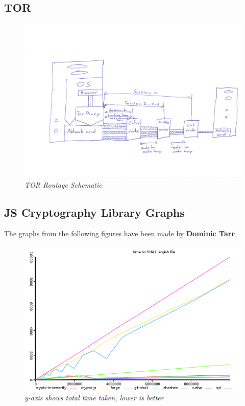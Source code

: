 
\subsection{TOR}
\begin{figure}[htpb]
\centering
\caption{\small \sl TOR Routage Schematic
\label{fig:tor-scheme}}  
\begin{adjustbox}{center}
\includegraphics[scale=0.081]{annexes/schemes/tor-scheme.jpg}
\end{adjustbox}
\end{figure}
\clearpage

\subsection{JS Cryptography Library Graphs}
The graphs from the following figures have been made by \textbf{Dominic Tarr} \cite {Tarr2014PerformanceLibraries.}

\begin{figure}[htpb]
\centering
\caption{\small \sl y-axis shows total time taken, lower is better
\label{fig:hash-sha1}}  
\includegraphics[scale=0.6]{graphs/hash-sha1.png}
\end{figure}

